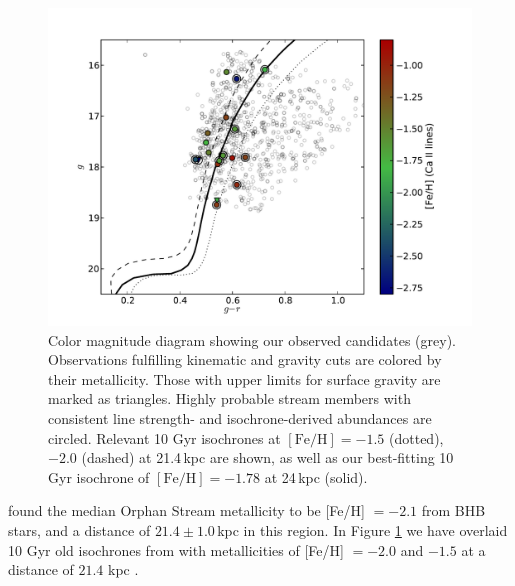 \documentclass{emulateapj}
\begin{document}
\begin{figure}[h]
	\includegraphics[width=\columnwidth]{./figures/cmd.pdf}
	\caption{Color magnitude diagram showing our observed candidates (grey). Observations fulfilling kinematic and gravity cuts are colored by their metallicity. Those with upper limits for surface gravity are marked as triangles. Highly probable stream members with consistent line strength- and isochrone-derived abundances are circled. Relevant 10 Gyr \citet{Girardi;et-al_2008} isochrones at $[\mbox{Fe/H}] = -1.5$ (dotted), $-2.0$ (dashed) at 21.4\,kpc \citep{Newberg;et-al_2010} are shown, as well as our best-fitting 10 Gyr isochrone of $[\mbox{Fe/H}] = -1.78$ at 24\,kpc (solid).}
	\label{fig:cmd}
\end{figure}

\citet{Newberg;et-al_2010} found the median Orphan Stream metallicity to be [Fe/H] $= -2.1$ from BHB stars, and a distance of $21.4 \pm 1.0$\,kpc in this region. In Figure \ref{fig:cmd} we have overlaid 10 Gyr old isochrones from \citet{Girardi;et-al_2008} with metallicities of [Fe/H] $= -2.0$ and $-1.5$ at a distance of $21.4$ kpc \citep{Newberg;et-al_2010}. 
\end{document}
